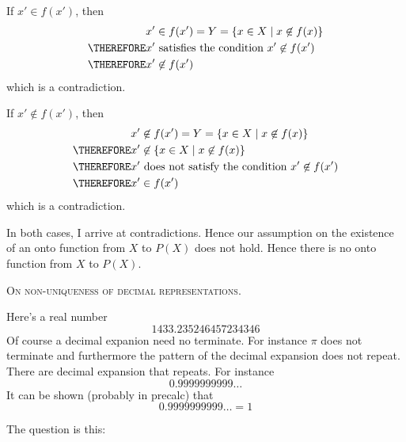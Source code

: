 If $x' \in f(x')$, then
\begin{align*}
  x' &\in f(x') = Y = \{x \in X \mid x \not\in f(x) \} \\
  \THEREFORE x' &\text{ satisfies the condition } x' \not\in f(x') \\
  \THEREFORE x' &\not\in f(x') 
\end{align*}
which is a contradiction.

If $x' \not\in f(x')$, then
\begin{align*}
x' &\not\in f(x') = Y = \{x \in X \mid x \not\in f(x) \} \\
\THEREFORE x' &\not\in \{x \in X \mid x \not\in f(x) \} \\
\THEREFORE x' &\text{ does not satisfy the condition } x' \not\in f(x') \\
\THEREFORE x' &\in f(x')
\end{align*}
which is a contradiction.

In both cases, I arrive at contradictions.
Hence our assumption on the existence of an onto function
from $X$ to $P(X)$ does not hold.
Hence there is no onto function from $X$ to $P(X)$.



%

\textsc{On non-uniqueness of decimal representations}.

Here's a real number
\[
1433.235246457234346
\]
Of course a decimal expanion need no terminate.
For instance $\pi$ does not terminate and furthermore the pattern
of the decimal expansion does not repeat.
There are decimal expansion that repeats.
For instance
\[
0.9999999999\ldots
\]
It can be shown (probably in precalc) that
\[
0.9999999999\ldots = 1
\]

The question is this:


